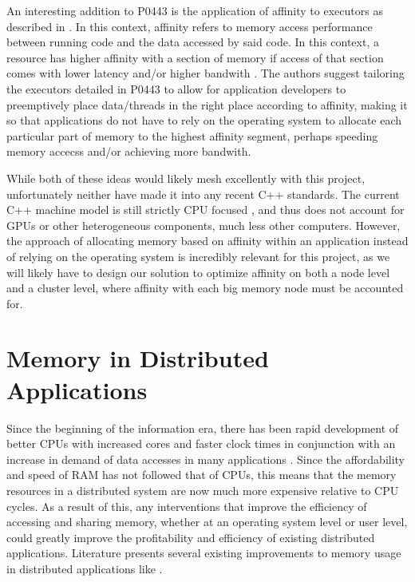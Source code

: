 {An interesting addition to P0443 is the application of affinity to executors as described in \cite{towards_dist_cpp}. In this context, affinity refers to memory access performance between running code and the data accessed by said code. In this context, a resource has higher affinity with a section of memory if access of that section comes with lower latency and/or higher bandwith \cite{towards_dist_cpp}. The authors suggest tailoring the executors detailed in P0443 to allow for application developers to preemptively place data/threads in the right place according to affinity, making it so that applications do not have to rely on the operating system to allocate each particular part of memory to the highest affinity segment, perhaps speeding memory accecss and/or achieving more bandwith. 

While both of these ideas would likely mesh excellently with this project, unfortunately neither have made it into any recent C++ standards. The current C++ machine model is still strictly CPU focused \cite{towards_dist_cpp}, and thus does not account for GPUs or other heterogeneous components, much less other computers. However, the approach of allocating memory based on affinity within an application instead of relying on the operating system is incredibly relevant for this project, as we will likely have to design our solution to optimize affinity on both a node level and a cluster level, where affinity with each big memory node must be accounted for.  

\section{Memory in Distributed Applications} \label{memory_distrib}
Since the beginning of the information era, there has been rapid development of better CPUs with increased cores and faster clock times in conjunction with an increase in demand of data accesses in many applications \cite{sharing_cpu_memory}. Since the affordability and speed of RAM has not followed that of CPUs, this means that the memory resources in a distributed system are now much more expensive relative to CPU cycles. As a result of this, any interventions that improve the efficiency of accessing and sharing memory, whether at an operating system level or user level, could greatly improve the profitability and efficiency of existing distributed applications. Literature presents several existing improvements to memory usage in distributed applications like \cite{virtual_memory_tlb} \cite{sharing_cpu_memory}.

}

